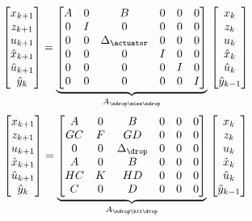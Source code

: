 %
\begin{equation}
    \begin{bmatrix}
        x_{k+1} \\
        z_{k+1} \\
        u_{k+1} \\
        \hat x_{k+1} \\
        \hat u_{k+1} \\
        \hat y_{k} \\
    \end{bmatrix} = \underbrace{\begin{bmatrix}
        A & 0 & B & 0 & 0 & 0 \\
        0 & I & 0 & 0 & 0 & 0 \\
        0 & 0 & \Delta_\actuator & 0 & 0 & 0 \\
        0 & 0 & 0 & I & 0 & 0 \\
        0 & 0 & 0 & 0 & I & 0 \\
        0 & 0 & 0 & 0 & 0 & I
    \end{bmatrix}}_{A_{\ndrop\miss\ndrop}}\, \begin{bmatrix}
        x_{k} \\
        z_{k} \\
        u_{k} \\
        \hat x_{k} \\
        \hat u_{k} \\
        \hat y_{k-1} \\
    \end{bmatrix}
\end{equation}
%
\begin{equation}
    \begin{bmatrix}
        x_{k+1} \\
        z_{k+1} \\
        u_{k+1} \\
        \hat x_{k+1} \\
        \hat u_{k+1} \\
        \hat y_{k} \\
    \end{bmatrix} = \underbrace{\begin{bmatrix}
        A & 0 & B & 0 & 0 & 0 \\
        GC & F & GD & 0 & 0 & 0 \\
        0 & 0 & \Delta_\drop & 0 & 0 & 0 \\
        A & 0 & B & 0 & 0 & 0 \\
        HC & K & HD & 0 & 0 & 0 \\
        C & 0 & D & 0 & 0 & 0
    \end{bmatrix}}_{A_{\ndrop\hit\drop}}\, \begin{bmatrix}
        x_{k} \\
        z_{k} \\
        u_{k} \\
        \hat x_{k} \\
        \hat u_{k} \\
        \hat y_{k-1} \\
    \end{bmatrix}
\end{equation}
